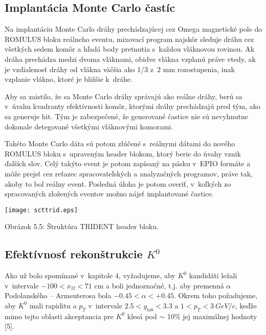 \subsection{Implantácia Monte Carlo častíc}
Na implantáciu Monte Carlo dráhy prechádzajúcej cez Omega magnetické pole do
ROMULUS bloku reálneho eventu, mixovací program najskôr sleduje dráhu cez
všetkých sedem komôr a hľadá body pretnutia s~každou vláknovou rovinou. Ak
dráha prechádza medzi dvoma vláknami, obidve vlákna vzplanú práve vtedy, ak
je vzdialenosť dráhy od vlákna väčšia ako 1/3 z~2 mm rozostupenia, inak
vzplanie vlákno, ktoré je bližšie k~dráhe.

Aby sa zaistilo, že sa Monte Carlo dráhy správajú ako reálne dráhy, berú
sa  v~úvahu kvadranty efektívnosti  komôr, ktorými dráhy prechádzajú pred
tým, ako sa generuje hit. Tým je zabezpečené, že generované častice nie
sú nevyhnutne dokonale detegované všetkými vláknovými komorami.

Takéto Monte Carlo dáta sú potom zlúčené s~reálnymi dátami do nového ROMULUS
bloku s~upraveným header blokom, ktorý berie do úvahy vznik ďalších slov.
Celý takýto event je potom zapísaný na pásku v~EPIO formáte a môže prejsť cez
reťazec spracovateľských a analyzačných programov, práve tak, akoby to bol
reálny event. Posledná úloha je potom overiť, v~koľkých zo spracovaných
zložených eventov možno nájsť implantované častice.
\begin{center}
  \texttt{[image: scttrid.eps]}
\end{center}
\begin{center}
  Obrázok 5.5: Štruktúra TRIDENT header bloku.
\end{center}


\subsection{Efektívnosť rekonštrukcie $K^{0}$}
Ako už bolo spomínané v~kapitole 4, vyžadujeme, aby $K^{0}$ kandidáti ležali
v~intervale $-100<x_{\Omega}<71$ cm a boli jednoznačné, t.j. aby premenná
$\alpha$  Podolanského -- Armenterosa bola  $-0.45<\alpha<+0.45$.
Okrem toho požadujeme, aby $K^{0}$ mali rapiditu a $p_{T}$ v~intervale
$2.5<y_{lab}<3.3$ a $1<p_{T}<3\: GeV/c$, keďže mimo tejto oblasti
akceptancia pre $K^{0}$ klesá
pod $\sim$ 10\% jej maximálnej hodnoty [5].

